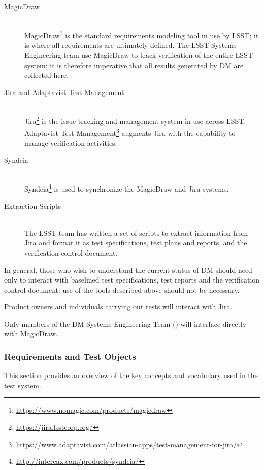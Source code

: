 \begin{description}

\item[MagicDraw] \hfill \\
MagicDraw\footnote{\url{https://www.nomagic.com/products/magicdraw}} is the standard requirements modeling tool in use by LSST; it is where all requirements are ultimately defined.
The LSST Systems Engineering team use MagicDraw to track verification of the entire LSST system; it is therefore imperative that all results generated by DM are collected here.

\item[Jira and Adaptavist Test Management] \hfill \\
Jira\footnote{\url{https://jira.lsstcorp.org/}} is the issue tracking and management system in use across LSST.
Adaptavist Test Management\footnote{\url{https://www.adaptavist.com/atlassian-apps/test-management-for-jira/}} augments Jira with the capability to manage verification activities.

\item[Syndeia] \hfill \\
Syndeia\footnote{\url{http://intercax.com/products/syndeia/}} is used to synchronize the MagicDraw and Jira systems.

\item[Extraction Scripts] \hfill \\
The LSST team has written a set of scripts to extract information from Jira and format it as test specifications, test plans and reports, and the verification control document.

\end{description}

In general, those who wish to understand the current status of DM should need only to interact with baselined test specifications, test reports and the verification control document: use of the tools described above should not be necessary.

Product owners and individuals carrying out tests will interact with Jira.

Only members of the DM Systems Engineering Team () will interface directly with MagicDraw.

\subsubsection{Requirements and Test Objects}
\label{sect:testobjects}

This section provides an overview of the key concepts and vocabulary used in the test system.

